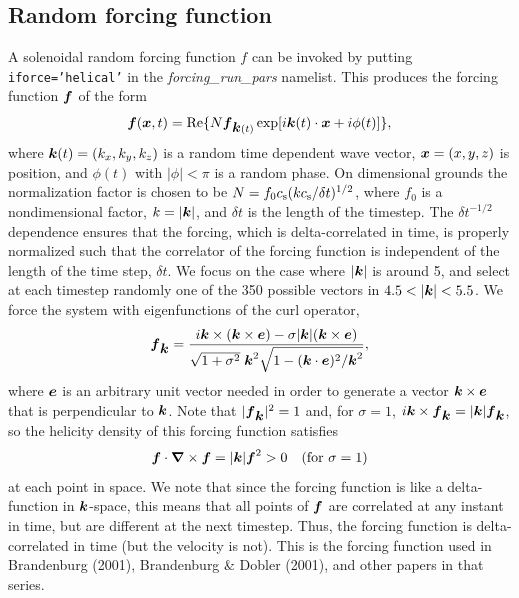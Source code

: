 \documentclass[\mydriver,12pt,twoside,notitlepage,a4paper]{article}
\makeatletter
\newcommand{\code}[1]{\texttt{#1}}
\newcommand{\name}[2][]{%
  \def\index@{#1}%
  \textsl{#2\/}%
  \ifx\index@\@empty\index{#2@\MakeUppercase #2}%
  \else\index{#1}%
  \fi%
}
\renewcommand{\vec}[1]{\mbox{\boldmath{$#1$}}}
\newcommand{\ev}            {\vec{e}}
\newcommand{\fv}            {\vec{f}}
\newcommand{\kv}            {\vec{k}}
\newcommand{\xv}            {\vec{x}}
\newcommand{\nab}{\mbox{\boldmath $\nabla$} {}}
\makeatother
\begin{document}

\subsection{Random forcing function}
\label{SRandomForcingFunction}

A solenoidal random forcing function $f$ can be invoked by putting
\code{iforce='helical'} in the \name{forcing_run_pars} namelist.
This produces the forcing function $\fv$ of the form
\begin{equation}
\fv(\xv,t)=\mbox{Re}\{N\fv_{\kv(t)}\exp[i\kv(t)\cdot\xv+i\phi(t)]\},
\end{equation}
where $\kv(t)=(k_x,k_y,k_z)$ is a random time dependent wave vector,
$\xv=(x,y,z)$ is position, and $\phi(t)$ with $|\phi|<\pi$ is
a random phase. On dimensional grounds the normalization factor
is chosen to be
$N=f_0 c_{\rm s}(kc_{\rm s}/\delta t)^{1/2}$, where $f_0$ is a
nondimensional factor, $k=|\kv|$, and $\delta t$ is the length of
the timestep.
The $\delta t^{-1/2}$ dependence ensures that the forcing,
which is delta-correlated in time, is properly normalized such
that the correlator of the forcing function is independent of the
length of the time step, $\delta t$.
We focus on the case where $|\kv|$ is around 5, and
select at each timestep randomly one of the 350 possible vectors in
$4.5<|\kv|<5.5$. We force the system with eigenfunctions of the curl
operator,
\begin{equation}
\fv_{\kv}={i\kv\times(\kv\times\ev)-\sigma|\kv|(\kv\times\ev)
\over\sqrt{1+\sigma^2}\;\kv^2\sqrt{1-(\kv\cdot\ev)^2/\kv^2}},
\end{equation}
where $\ev$ is an arbitrary unit vector needed in order
to generate a vector $\kv\times\ev$ that is perpendicular
to $\kv$. Note that $|\fv_{\kv}|^2=1$ and, for $\sigma=1$,
$i\kv\times\fv_{\kv}=|\kv|\fv_{\kv}$, so the helicity density of this
forcing function satisfies
\begin{equation}
\fv\cdot\nab\times\fv=|\kv|\fv^2>0\quad(\mbox{for $\sigma=1$})
\end{equation}
at each point in space. We note that since the forcing function is like
a delta-function in $\kv$-space, this means that all points of $\fv$
are correlated at any instant in time, but are different at the next
timestep. Thus, the forcing function is delta-correlated in time (but
the velocity is not). This is the forcing function used in Brandenburg
(2001), Brandenburg \& Dobler (2001), and other papers in that series.
\end{document}
